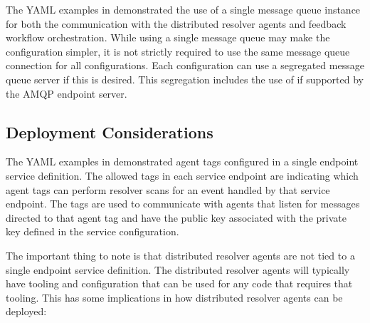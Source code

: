 The YAML examples in  demonstrated the use of a single
message queue instance for both the communication with the distributed resolver agents and feedback workflow
orchestration.  While using a single message queue may make the \cxoneflow configuration simpler, it is not
strictly required to use the same message queue connection for all configurations.  Each configuration can
use a segregated message queue server if this is desired.  This segregation includes the use
of  if supported by the AMQP endpoint server.


\subsection{Deployment Considerations}

The YAML examples in  demonstrated agent tags
configured in a single endpoint service definition.  The allowed tags in each service endpoint are
indicating which agent tags can perform resolver scans for an event handled by that service endpoint.
The tags are used to communicate with agents that listen for messages directed to that agent tag and
have the public key associated with the private key defined in the service configuration.

The important thing to note is that distributed resolver agents are not tied to a single
\cxoneflow endpoint service definition.  The distributed resolver agents will typically have
tooling and configuration that can be used for any code that requires that tooling.  This
has some implications in how distributed resolver agents can be deployed:

